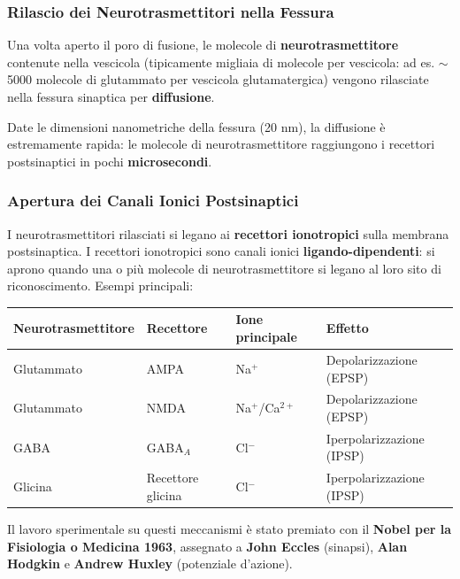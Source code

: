 \subsubsection{Rilascio dei Neurotrasmettitori nella Fessura}

Una volta aperto il poro di fusione, le molecole di \textbf{neurotrasmettitore} contenute nella vescicola (tipicamente migliaia di molecole per vescicola: ad es. $\sim$5000 molecole di glutammato per vescicola glutamatergica) vengono rilasciate nella fessura sinaptica per \textbf{diffusione}.

Date le dimensioni nanometriche della fessura (20 nm), la diffusione è estremamente rapida: le molecole di neurotrasmettitore raggiungono i recettori postsinaptici in pochi \textbf{microsecondi}.

\subsubsection{Apertura dei Canali Ionici Postsinaptici}

I neurotrasmettitori rilasciati si legano ai \textbf{recettori ionotropici} sulla membrana postsinaptica. I recettori ionotropici sono canali ionici \textbf{ligando-dipendenti}: si aprono quando una o più molecole di neurotrasmettitore si legano al loro sito di riconoscimento. Esempi principali:

\begin{table}[htbp]
    \centering
    \renewcommand{\arraystretch}{1.3}
    \begin{tabularx}{\textwidth}{|X|X|X|X|}
    \hline
    \textbf{Neurotrasmettitore} & \textbf{Recettore} & \textbf{Ione principale} & \textbf{Effetto} \\
    \hline
    Glutammato & AMPA & Na$^+$ & Depolarizzazione (EPSP) \\
    \hline
    Glutammato & NMDA & Na$^+$/Ca$^{2+}$ & Depolarizzazione (EPSP) \\
    \hline
    GABA & GABA$_A$ & Cl$^-$ & Iperpolarizzazione (IPSP) \\
    \hline
    Glicina & Recettore glicina & Cl$^-$ & Iperpolarizzazione (IPSP) \\
    \hline
    \end{tabularx}
\end{table}

Il lavoro sperimentale su questi meccanismi è stato premiato con il \textbf{Nobel per la Fisiologia o Medicina 1963}, assegnato a \textbf{John Eccles} (sinapsi), \textbf{Alan Hodgkin} e \textbf{Andrew Huxley} (potenziale d'azione).


